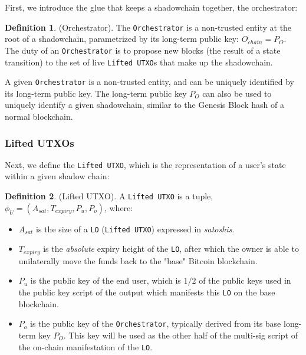 \documentclass[10pt,a4paper]{article}
\theoremstyle{definition}
\newtheorem{definition}{Definition}[section]
\begin{document}
First, we introduce the glue that keeps a shadowchain together, the
orchestrator:

\theoremstyle{definition}
\begin{definition}{(Orchestrator).} The \texttt{Orchestrator} is a non-trusted
    entity at the root of a shadowchain, parametrized by its long-term public
    key: $O_{chain} = P_{O}$. The duty of an \texttt{Orchestrator} is to
    propose new blocks (the result of a state transition) to the set of live
    \texttt{Lifted UTXO}s that make up the shadowchain.
\end{definition}

A given \texttt{Orchestrator} is a non-trusted entity, and can be uniquely
identified by its long-term public key. The long-term public key $P_{O}$ can
also be used to uniquely identify a given shadowchain, similar to the Genesis
Block hash of a normal blockchain.

\subsubsection{Lifted UTXOs}

Next, we define the \texttt{Lifted UTXO}, which is the representation of a
user's state within a given shadow chain:

\begin{definition}{(Lifted UTXO).} A \texttt{Lifted UTXO} is a tuple,
    $ \phi_{U} = (A_{sat}, T_{expiry}, P_{u}, P_{o})$, where:
\end{definition}

\begin{itemize}
    \item $A_{sat}$ is the size of a \texttt{LO} (\texttt{Lifted UTXO})
        expressed in \emph{satoshis}.

    \item $T_{expiry}$ is the \emph{absolute} expiry height of the \texttt{LO},
        after which the owner is able to unilaterally move the funds back to
        the "base" Bitcoin blockchain.

    \item $P_{u}$ is the public key of the end user, which is $1/2$ of the
        public keys used in the public key script of the output which manifests
        this \texttt{LO} on the base blockchain.

    \item $P_{o}$ is the public key of the \texttt{Orchestrator}, typically
        derived from its base long-term key $P_O$. This key will be used as the
        other half of the multi-sig script of the on-chain manifestation of the
        \texttt{LO}.
\end{itemize}
\end{document}
